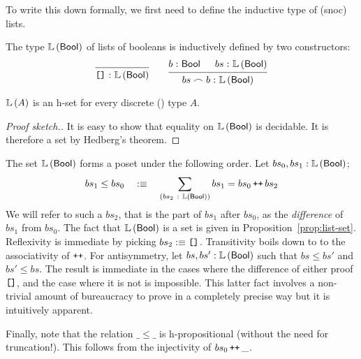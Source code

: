 To write this down formally, we first need to define the inductive type of (snoc) lists.

\begin{defn}[Lists]\label{defn:list}
  The type $\mathbb{L}\left(\mathsf{Bool}{}\right)$ of lists of booleans is inductively defined by two constructors:
  \[
    \begin{prooftree}
      \infer0{\oftyI{\emptylist{}}{\listty{\bool{}}}}
    \end{prooftree}
    \qquad
    \begin{prooftree}
      \hypo{\oftyI{b}{\bool{}}}
      \hypo{\oftyI{bs}{\listty{\bool{}}}}
      \infer2{\oftyI{bs \frown b}{\listty{\bool{}}}}
    \end{prooftree}
  \]
\end{defn}

\begin{prop}\label{prop:list-set}
  $\mathbb{L}\left(A\right)$ is an h-set for every discrete () type $A$.
\end{prop}
\begin{proof}[Proof sketch.]
  It is easy to show that equality on $\mathbb{L}\left(\mathsf{Bool}{}\right)$ is decidable. It is therefore a set
  by Hedberg's theorem.
\end{proof}


\begin{defn}\label{defn:cantor-poset}
  The set $\mathbb{L}\left(\mathsf{Bool}{}\right)$ forms a poset under the following order. Let
  $bs_0, bs_1:\mathbb{L}\left(\mathsf{Bool}{}\right)$;
  \begin{equation*}
    bs_1 \le bs_0 \quad:\equiv\quad \sum_{(bs_2~:~\mathbb{L}\left(\mathsf{Bool}{}\right))} bs_1 = bs_0 \operatorname{\text{\texttt{++}}} bs_2
  \end{equation*}
  We will refer to such a $bs_2$, that is the part of $bs_1$ after $bs_0$, as the
  \emph{difference} of $bs_1$ from $bs_0$. The fact that $\mathbb{L}\left(\mathsf{Bool}{}\right)$ is a set is
  given in Proposition~\ref{prop:list-set}. Reflexivity is immediate by picking $bs_2 :\equiv
  \text{\texttt{[]}}{}$. Transitivity boils down to to the associativity of $\operatorname{\text{\texttt{++}}}$. For
  antisymmetry, let $bs, bs':\mathbb{L}\left(\mathsf{Bool}{}\right)$ such that $bs \le bs'$ and $bs' \le
  bs$. The result is immediate in the cases where the difference of either proof
  $\text{\texttt{[]}}$, and the case where it is not is impossible. This latter fact involves a
  non-trivial amount of bureaucracy to prove in a completely precise way but it is
  intuitively apparent.

  Finally, note that the relation $\_\le\_$ is h-propositional (without the need for
  truncation!). This follows from the injectivity of $bs_0 \operatorname{\text{\texttt{++}}} \_$.
\end{defn}

